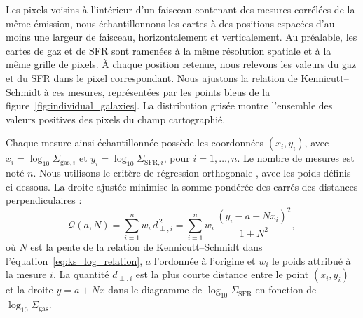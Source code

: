 Les pixels voisins à l'intérieur d'un faisceau contenant des mesures corrélées de la même émission, nous échantillonnons les cartes à des positions espacées d'au moins une largeur de faisceau, horizontalement et verticalement. Au préalable, les cartes de gaz et de SFR sont ramenées à la même résolution spatiale et à la même grille de pixels. À chaque position retenue, nous relevons les valeurs du gaz et du SFR dans le pixel correspondant. Nous ajustons la relation de Kennicutt--Schmidt à ces mesures, représentées par les points bleus de la figure~\ref{fig:individual_galaxies}. La distribution grisée montre l'ensemble des valeurs positives des pixels du champ cartographié.

Chaque mesure ainsi échantillonnée possède les coordonnées $(x_i,y_i)$, avec $x_i=\log_{10}\Sigma_{\mathrm{gas},i}$ et $y_i=\log_{10}\Sigma_{\mathrm{SFR},i}$, pour $i=1,\ldots,n$. Le nombre de mesures est noté $n$. Nous utilisons le critère de régression orthogonale \citep{Pearson1901,Isobe1990}, avec les poids définis ci-dessous. La droite ajustée minimise la somme pondérée des carrés des distances perpendiculaires :
\begin{equation}
\label{eq:ks_weighted_distance}
\mathcal{Q}(a,N)
=\sum_{i=1}^{n} w_i\,d_{\perp,i}^{\,2}
=\sum_{i=1}^{n} w_i\,\frac{(y_i-a-Nx_i)^2}{1+N^2},
\end{equation}
\noindent où $N$ est la pente de la relation de Kennicutt--Schmidt dans l'équation~\ref{eq:ks_log_relation}, $a$ l'ordonnée à l'origine et $w_i$ le poids attribué à la mesure $i$. La quantité $d_{\perp,i}$ est la plus courte distance entre le point $(x_i,y_i)$ et la droite $y=a+Nx$ dans le diagramme de $\log_{10}\Sigma_{\mathrm{SFR}}$ en fonction de $\log_{10}\Sigma_{\mathrm{gas}}$.

